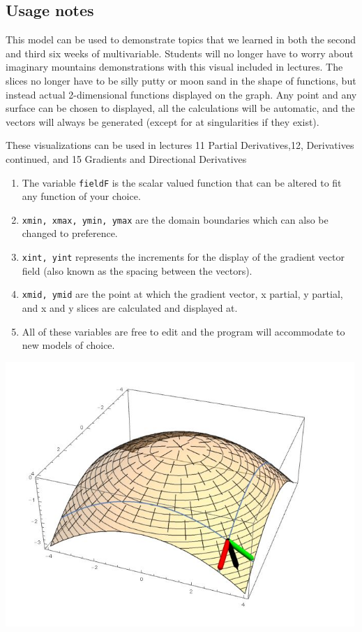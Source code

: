 \subsection*{Usage notes}

This model can be used to demonstrate topics that we learned in both the second and third six weeks of multivariable. Students will no longer have to worry about imaginary mountains demonstrations with this visual included in lectures. The slices no longer have to be silly putty or moon sand in the shape of functions, but instead actual 2-dimensional functions displayed on the graph. Any point and any surface can be chosen to displayed, all the calculations will be automatic, and the vectors will always be generated (except for at singularities if they exist).

These visualizations can be used in lectures 11 Partial Derivatives,12, Derivatives continued, and 15 Gradients and Directional Derivatives

\begin{enumerate}
\item The variable \verb+fieldF+ is the scalar valued function that can be altered to fit any function of your choice. 
\item \verb+xmin, xmax, ymin, ymax+ are the domain boundaries which can also be changed to preference.
\item \verb+xint, yint+ represents the increments for the display of the gradient vector field (also known as the spacing between the vectors).
\item \verb+xmid, ymid+ are the point at which the gradient vector, x partial, y partial, and x and y slices are calculated and displayed at. 
\item All of these variables are free to edit and the program will accommodate to new models of choice. 
\end{enumerate}

\includegraphics[height=10cm]{../exhibit/field.jpg}

